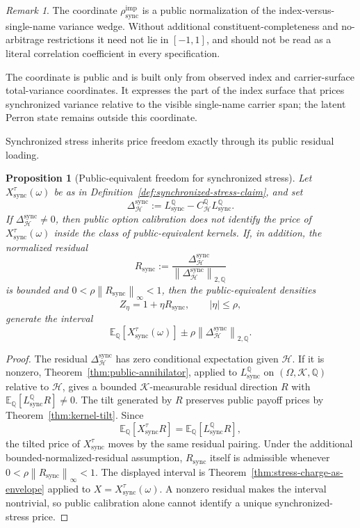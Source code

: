 \documentclass[11pt,a4paper]{amsart}
\theoremstyle{plain}
\newtheorem{proposition}[theorem]{Proposition}
\theoremstyle{definition}
\theoremstyle{remark}
\newtheorem{remark}[theorem]{Remark}
\newcommand{\QQ}{\mathbb{Q}}
\newcommand{\EE}{\mathbb{E}}
\newcommand{\cH}{\mathcal{H}}
\newcommand{\cK}{\mathcal{K}}
\newcommand{\norm}[1]{\left\lVert #1\right\rVert}
\begin{document}
\begin{remark}
The coordinate \(\rho_{\mathrm{sync}}^{\mathrm{imp}}\) is a public normalization of the
index-versus-single-name variance wedge.  Without additional constituent-completeness and
no-arbitrage restrictions it need not lie in \([-1,1]\), and should not be read as a literal
correlation coefficient in every specification.
\end{remark}

The coordinate is public and is built only from observed index and carrier-surface total-variance
coordinates.  It expresses the part of the index surface that prices synchronized variance relative
to the visible single-name carrier span; the latent Perron state remains outside this coordinate.

Synchronized stress inherits price freedom exactly through its public residual loading.

\begin{proposition}[Public-equivalent freedom for synchronized stress]\label{prop:sync-residual-freedom}
Let \(X_{\mathrm{sync}}^\tau(\omega)\) be as in
Definition~\ref{def:synchronized-stress-claim}, and set
\[
        \Delta_{\cH}^{\mathrm{sync}}
        :=
        L_{\mathrm{sync}}^\QQ
        -
        C_{\cH}^{\QQ}L_{\mathrm{sync}}^\QQ.
 \]
If \(\Delta_{\cH}^{\mathrm{sync}}\ne0\), then public option calibration does not identify the
price of \(X_{\mathrm{sync}}^\tau(\omega)\) inside the class of public-equivalent kernels.  If, in
addition, the normalized residual
\[
        R_{\mathrm{sync}}
        :=
        \frac{\Delta_{\cH}^{\mathrm{sync}}}
             {\norm{\Delta_{\cH}^{\mathrm{sync}}}_{2,\QQ}}
\]
is bounded and \(0<\rho\norm{R_{\mathrm{sync}}}_\infty<1\), then the public-equivalent densities
\[
        Z_\eta=1+\eta R_{\mathrm{sync}},
        \qquad |\eta|\le\rho,
\]
generate the interval
\[
        \EE_\QQ[X_{\mathrm{sync}}^\tau(\omega)]
        \pm
        \rho\norm{\Delta_{\cH}^{\mathrm{sync}}}_{2,\QQ}.
\]
\end{proposition}

\begin{proof}
The residual \(\Delta_{\cH}^{\mathrm{sync}}\) has zero conditional expectation given \(\cH\).  If it
is nonzero, Theorem~\ref{thm:public-annihilator}, applied to \(L_{\mathrm{sync}}^\QQ\) on
\((\Omega,\cK,\QQ)\) relative to \(\cH\), gives a bounded \(\cK\)-measurable residual direction
\(R\) with \(\EE_\QQ[L_{\mathrm{sync}}^\QQ R]\ne0\).  The tilt generated by \(R\) preserves public
payoff prices by Theorem~\ref{thm:kernel-tilt}.  Since
\[
        \EE_\QQ[X_{\mathrm{sync}}^\tau R]
        =
        \EE_\QQ[L_{\mathrm{sync}}^\QQ R],
\]
the tilted price of \(X_{\mathrm{sync}}^\tau\) moves by the same residual pairing.  Under the
additional bounded-normalized-residual assumption, \(R_{\mathrm{sync}}\) itself is admissible
whenever \(0<\rho\norm{R_{\mathrm{sync}}}_\infty<1\).  The displayed interval is
Theorem~\ref{thm:stress-charge-as-envelope} applied to \(X=X_{\mathrm{sync}}^\tau(\omega)\).  A
nonzero residual makes the interval nontrivial, so public calibration alone cannot identify a
unique synchronized-stress price.
\end{proof}
\end{document}
